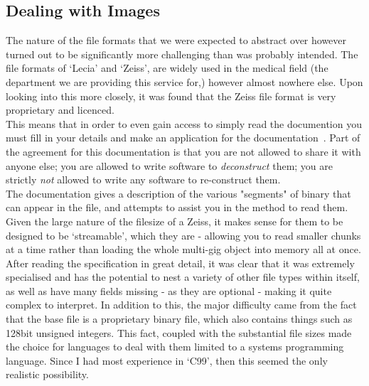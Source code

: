 \subsection{Dealing with Images}
The nature of the file formats that we were expected to abstract over however turned out to be significantly
more challenging than was probably intended. The file formats of `Lecia' and `Zeiss', are widely used in the
medical field (the department we are providing this service for,) however almost nowhere else. Upon looking
into this more closely, it was found that the Zeiss file format is very proprietary and licenced.\\
This means that in order to even gain access to simply read the documention you must fill in your details
and make an application for the documentation~\cite{zeissLicence}. Part of the agreement for this documentation is that you are
not allowed to share it with anyone else; you are allowed to write software to \emph{deconstruct} them; you
are strictly \emph{not} allowed to write any software to re-construct them.\\
The documentation gives a description of the various "segments" of binary that can appear in the file, and
attempts to assist you in the method to read them. Given the large nature of the filesize of a Zeiss, it makes
sense for them to be designed to be `streamable', which they are - allowing you to read smaller chunks at a
time rather than loading the whole multi-gig object into memory all at once.\\
After reading the specification in great detail, it was clear that it was extremely specialised and has
the potential to nest a variety of other file types within itself, as well as have many fields missing
- as they are optional - making it quite complex to interpret. In addition to this, the major difficulty
came from the fact that the base file is a proprietary binary file, which also contains things such as 128bit
unsigned integers. This fact, coupled with the substantial file sizes made the choice for languages to deal
with them limited to a systems programming language. Since I had most experience in `C99', then this seemed
the only realistic possibility.\\

\vspace{0.3cm}
